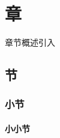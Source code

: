 \chapter{章}\label{1}

章节概述引入

\section{节}\label{1-1}

\subsection{小节}\label{1-1-1}

\subsubsection{小小节}\label{1-1-1-1}

